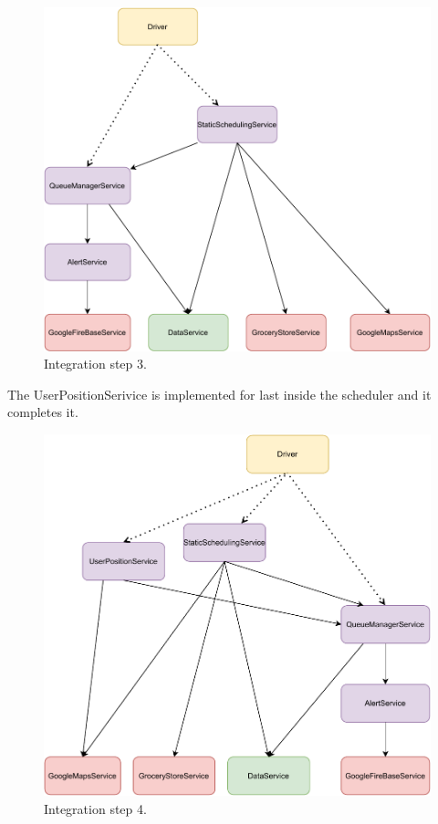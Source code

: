 \begin{figure}[H]
    \centering
    \includegraphics[width=1.0\textwidth]{images/component3.pdf}
    \caption{Integration step 3.}
\end{figure}

The UserPositionSerivice is implemented for last inside the scheduler and it completes it.

\begin{figure}[H]
    \centering
    \includegraphics[width=1.0\textwidth]{images/component4.pdf}
    \caption{Integration step 4.}
\end{figure}


